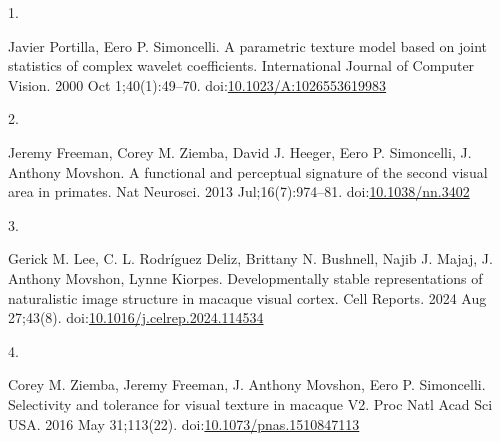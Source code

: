 \documentclass[
  11pt,
  letterpaper,
  DIV=11,
  numbers=noendperiod]{scrartcl}
\newlength{\cslhangindent}
\newlength{\csllabelwidth}
\newenvironment{CSLReferences}[2] %
 {\begin{list}{}{%
  \setlength{\itemindent}{0pt}
  \setlength{\leftmargin}{0pt}
  \setlength{\parsep}{0pt}
  \ifodd #1
   \setlength{\leftmargin}{\cslhangindent}
   \setlength{\itemindent}{-1\cslhangindent}
  \fi
  \setlength{\itemsep}{#2\baselineskip}}}
 {\end{list}}
\newcommand{\CSLLeftMargin}[1]{\parbox[t]{\csllabelwidth}{\strut#1\strut}}
\newcommand{\CSLRightInline}[1]{\parbox[t]{\linewidth - \csllabelwidth}{\strut#1\strut}}
\begin{document}
\label{refs}
\begin{CSLReferences}{0}{1}
\CSLLeftMargin{1. }%
\CSLRightInline{Javier Portilla, Eero P. Simoncelli. A parametric
texture model based on joint statistics of complex wavelet coefficients.
International Journal of Computer Vision. 2000 Oct 1;40(1):49--70.
doi:\href{https://doi.org/10.1023/A:1026553619983}{10.1023/A:1026553619983}}

\CSLLeftMargin{2. }%
\CSLRightInline{Jeremy Freeman, Corey M. Ziemba, David J. Heeger, Eero
P. Simoncelli, J. Anthony Movshon. A functional and perceptual signature
of the second visual area in primates. Nat Neurosci. 2013
Jul;16(7):974--81.
doi:\href{https://doi.org/10.1038/nn.3402}{10.1038/nn.3402}}

\CSLLeftMargin{3. }%
\CSLRightInline{Gerick M. Lee, C. L. Rodríguez Deliz, Brittany N.
Bushnell, Najib J. Majaj, J. Anthony Movshon, Lynne Kiorpes.
Developmentally stable representations of naturalistic image structure
in macaque visual cortex. Cell Reports. 2024 Aug 27;43(8).
doi:\href{https://doi.org/10.1016/j.celrep.2024.114534}{10.1016/j.celrep.2024.114534}}

\CSLLeftMargin{4. }%
\CSLRightInline{Corey M. Ziemba, Jeremy Freeman, J. Anthony Movshon,
Eero P. Simoncelli. Selectivity and tolerance for visual texture in
macaque V2. Proc Natl Acad Sci USA. 2016 May 31;113(22).
doi:\href{https://doi.org/10.1073/pnas.1510847113}{10.1073/pnas.1510847113}}

\end{CSLReferences}
\end{document}
